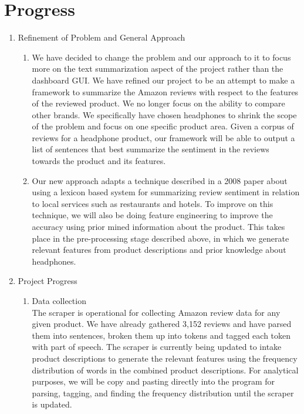 \documentclass{article}
\begin{document}
\section{Progress}
\begin{enumerate}
\item Refinement of Problem and General Approach
	\begin{enumerate} [label* = \arabic*.]
	\item We have decided to change the problem and our approach to it to focus more on the text summarization aspect of the project rather than the dashboard GUI. We have refined our project to be an attempt to make a framework to summarize the Amazon reviews with respect to the features of the reviewed product. We no longer focus on the ability to compare other brands. We specifically have chosen headphones to shrink the scope of the problem and focus on one specific product area. Given a corpus of reviews for a headphone product, our framework will be able to output a list of sentences that best summarize the sentiment in the reviews towards the product and its features.
	\item Our new approach adapts a technique described in a 2008 paper about using a lexicon based system for summarizing review sentiment in relation to local services such as restaurants and hotels. To improve on this technique, we will also be doing feature engineering to improve the accuracy using prior mined information about the product. This takes place in the pre-processing stage described above, in which we generate relevant features from product descriptions and prior knowledge about headphones.
	\end{enumerate}
\item Project Progress 
	\begin{enumerate} [label* = \arabic*.]
	\item Data collection \\
	The scraper is operational for collecting Amazon review data for any given product. We have already gathered 3,152 reviews and have parsed them into sentences, broken them up into tokens and tagged each token with part of speech. The scraper is currently being updated to intake product descriptions to generate the relevant features using the frequency distribution of words in the combined product descriptions. For analytical purposes, we will be copy and pasting directly into the program for parsing, tagging, and finding the frequency distribution until the scraper is updated. 
	\end{enumerate} 

\end{enumerate}
\end{document}
